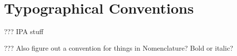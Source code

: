 \renewcommand\contentsname{Table of Contents}
\tableofcontents
\cleardoublepage
{}

\listoftables
\cleardoublepage
{}

\listoffigures
\cleardoublepage
{}


\chapter*{Typographical Conventions}
\label{typography}

??? IPA stuff

??? Also figure out a convention for things in Nomenclature?
Bold or italic?

\cleardoublepage
{}

